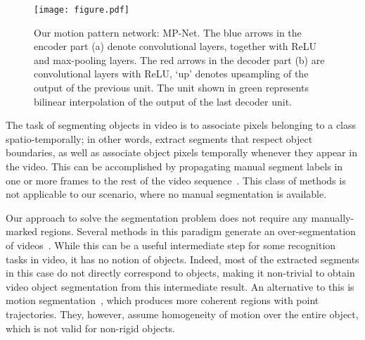 \documentclass[10pt,twocolumn,letterpaper]{article}
\begin{document}
\begin{figure*}[th]
\begin{center}
\texttt{[image: figure.pdf]}
\end{center}
\vspace{-0.4cm}
\caption{Our motion pattern network: MP-Net. The blue arrows in the encoder
part (a) denote convolutional layers, together with ReLU and max-pooling
layers. The red arrows in the decoder part (b) are convolutional layers with
ReLU, `up' denotes  upsampling of the output of the previous unit.
The unit shown in green represents bilinear interpolation of the output of the
last decoder unit. \vspace{-0.45cm}}
\label{fig:model}
\end{figure*}

\vspace{-0.2cm}
 The task of segmenting objects in video
is to associate pixels belonging to a class spatio-temporally; in other words,
extract segments that respect object boundaries, as well as associate object
pixels temporally whenever they appear in the video. This can be accomplished
by propagating manual segment labels in one or more frames to the rest of the
video sequence~\cite{Badrinarayanan10}. This class of methods is not applicable
to our scenario, where no manual segmentation is available.

Our approach to solve the segmentation problem does not require any
manually-marked regions. Several methods in this paradigm generate an
over-segmentation of
videos~\cite{Brendel09,Grundmann10,Lezama11,XuC16,Khoreva15}. While this can be
a useful intermediate step for some recognition tasks in video, it has no
notion of objects. Indeed, most of the extracted segments in this case do not
directly correspond to objects, making it non-trivial to obtain video object
segmentation from this intermediate result. An alternative to this is motion
segmentation~\cite{brox2010object,fragkiadaki2012video,ochs2012higher}, which
produces more coherent regions with point trajectories. They, however, assume
homogeneity of motion over the entire object, which is not valid for non-rigid
objects.
\end{document}
